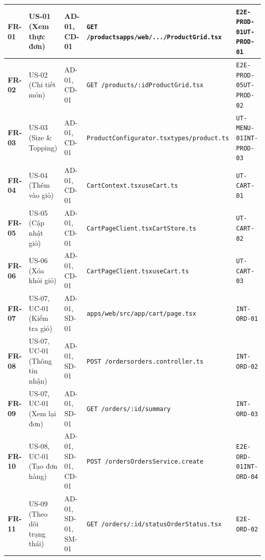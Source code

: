 \documentclass[a4paper]{article}
\begin{document}
\begin{longtable}{|>{\centering\arraybackslash}p{}|>{\centering\arraybackslash}p{}|>{\centering\arraybackslash}p{}|p{}|p{}|}
\textbf{FR-01} & US-01 (Xem thực đơn) & AD-01, CD-01 & \texttt{GET /products}\newline\texttt{apps/web/.../ProductGrid.tsx} & \texttt{E2E-PROD-01}\newline\texttt{UT-PROD-01} \\
\hline
\textbf{FR-02} & US-02 (Chi tiết món) & AD-01, CD-01 & \texttt{GET /products/:id}\newline\texttt{ProductGrid.tsx} & \texttt{E2E-PROD-05}\newline\texttt{UT-PROD-02} \\
\hline
\textbf{FR-03} & US-03 (Size \& Topping) & AD-01, CD-01 & \texttt{ProductConfigurator.tsx}\newline\texttt{types/product.ts} & \texttt{UT-MENU-01}\newline\texttt{INT-PROD-03} \\
\hline
\textbf{FR-04} & US-04 (Thêm vào giỏ) & AD-01, CD-01 & \texttt{CartContext.tsx}\newline\texttt{useCart.ts} & \texttt{UT-CART-01} \\
\hline
\textbf{FR-05} & US-05 (Cập nhật giỏ) & AD-01, CD-01 & \texttt{CartPageClient.tsx}\newline\texttt{CartStore.ts} & \texttt{UT-CART-02} \\
\hline
\textbf{FR-06} & US-06 (Xóa khỏi giỏ) & AD-01, CD-01 & \texttt{CartPageClient.tsx}\newline\texttt{useCart.ts} & \texttt{UT-CART-03} \\
\hline
\textbf{FR-07} & US-07, UC-01 (Kiểm tra giỏ) & AD-01, SD-01 & \texttt{apps/web/src/app/cart/page.tsx} & \texttt{INT-ORD-01} \\
\hline
\textbf{FR-08} & US-07, UC-01 (Thông tin nhận) & AD-01, SD-01 & \texttt{POST /orders}\newline\texttt{orders.controller.ts} & \texttt{INT-ORD-02} \\
\hline
\textbf{FR-09} & US-07, UC-01 (Xem lại đơn) & AD-01, SD-01 & \texttt{GET /orders/:id/summary} & \texttt{INT-ORD-03} \\
\hline
\textbf{FR-10} & US-08, UC-01 (Tạo đơn hàng) & AD-01, SD-01, CD-01 & \texttt{POST /orders}\newline\texttt{OrdersService.create} & \texttt{E2E-ORD-01}\newline\texttt{INT-ORD-04} \\
\hline
\textbf{FR-11} & US-09 (Theo dõi trạng thái) & AD-01, SD-01, SM-01 & \texttt{GET /orders/:id/status}\newline\texttt{OrderStatus.tsx} & \texttt{E2E-ORD-02} \\

\end{longtable}
\end{document}
